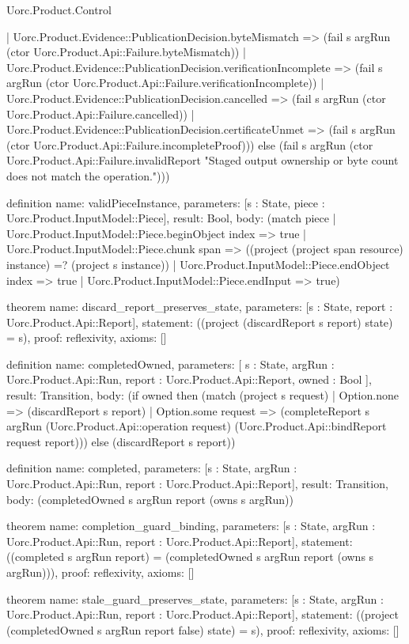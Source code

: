 \begin{lexlean}{Uorc.Product.Control}
\begin{semanticmodule}
{    | Uorc.Product.Evidence::PublicationDecision.byteMismatch => (fail s argRun (ctor Uorc.Product.Api::Failure.byteMismatch))
    | Uorc.Product.Evidence::PublicationDecision.verificationIncomplete => (fail s argRun (ctor Uorc.Product.Api::Failure.verificationIncomplete))
    | Uorc.Product.Evidence::PublicationDecision.cancelled => (fail s argRun (ctor Uorc.Product.Api::Failure.cancelled))
    | Uorc.Product.Evidence::PublicationDecision.certificateUnmet => (fail s argRun (ctor Uorc.Product.Api::Failure.incompleteProof))) else (fail s argRun (ctor Uorc.Product.Api::Failure.invalidReport "Staged output ownership or byte count does not match the operation.")))
}

definition{
  name: validPieceInstance,
  parameters: [s : State, piece : Uorc.Product.InputModel::Piece],
  result: Bool,
  body: (match piece
    | Uorc.Product.InputModel::Piece.beginObject index => true
    | Uorc.Product.InputModel::Piece.chunk span => ((project (project span resource) instance) =? (project s instance))
    | Uorc.Product.InputModel::Piece.endObject index => true
    | Uorc.Product.InputModel::Piece.endInput => true)
}

theorem{
  name: discard_report_preserves_state,
  parameters: [s : State, report : Uorc.Product.Api::Report],
  statement: ((project (discardReport s report) state) = s),
  proof: reflexivity{},
  axioms: []
}

definition{
  name: completedOwned,
  parameters: [
    s : State,
    argRun : Uorc.Product.Api::Run,
    report : Uorc.Product.Api::Report,
    owned : Bool
  ],
  result: Transition,
  body: (if owned then (match (project s request)
    | Option.none => (discardReport s report)
    | Option.some request => (completeReport s argRun (Uorc.Product.Api::operation request) (Uorc.Product.Api::bindReport request report))) else (discardReport s report))
}

definition{
  name: completed,
  parameters: [s : State, argRun : Uorc.Product.Api::Run, report : Uorc.Product.Api::Report],
  result: Transition,
  body: (completedOwned s argRun report (owns s argRun))
}

theorem{
  name: completion_guard_binding,
  parameters: [s : State, argRun : Uorc.Product.Api::Run, report : Uorc.Product.Api::Report],
  statement: ((completed s argRun report) = (completedOwned s argRun report (owns s argRun))),
  proof: reflexivity{},
  axioms: []
}

theorem{
  name: stale_guard_preserves_state,
  parameters: [s : State, argRun : Uorc.Product.Api::Run, report : Uorc.Product.Api::Report],
  statement: ((project (completedOwned s argRun report false) state) = s),
  proof: reflexivity{},
  axioms: []
}


\end{semanticmodule}
\end{lexlean}
